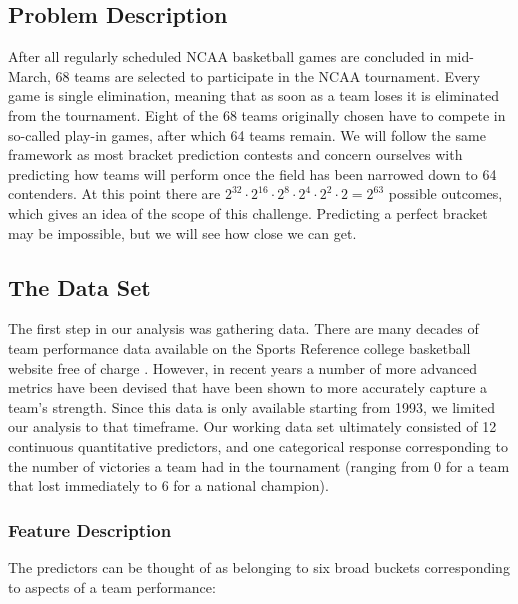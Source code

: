 \documentclass[10pt,a4paper, hidelinks]{article} %
\begin{document}
\subsection{Problem Description}
After all regularly scheduled NCAA basketball games are concluded in mid-March, 68 teams are selected to participate in the NCAA tournament. Every game is single elimination, meaning that as soon as a team loses it is eliminated from the tournament. Eight of the 68 teams originally chosen have to compete in so-called play-in games, after which 64 teams remain. We will follow the same framework as most bracket prediction contests and concern ourselves with predicting how teams will perform once the field has been narrowed down to 64 contenders. At this point there are $2^{32} \cdot 2^{16} \cdot 2^8 \cdot 2^4 \cdot 2^2 \cdot 2 = 2^{63}$ possible outcomes, which gives an idea of the scope of this challenge. Predicting a perfect bracket may be impossible, but we will see how close we can get.

\subsection{The Data Set}

The first step in our analysis was gathering data. There are many decades of team performance data available on the Sports Reference college basketball website free of charge \cite{bballsite}. However, in recent years a number of more advanced metrics have been devised that have been shown to more accurately capture a team's strength. Since this data is only available starting from 1993, we limited our analysis to that timeframe. Our working data set ultimately consisted of 12 continuous quantitative predictors, and one categorical response corresponding to the number of victories a team had in the tournament (ranging from 0 for a team that lost immediately to 6 for a national champion).

\subsubsection{Feature Description}

The predictors can be thought of as belonging to six broad buckets corresponding to aspects of a team performance:
\end{document}
